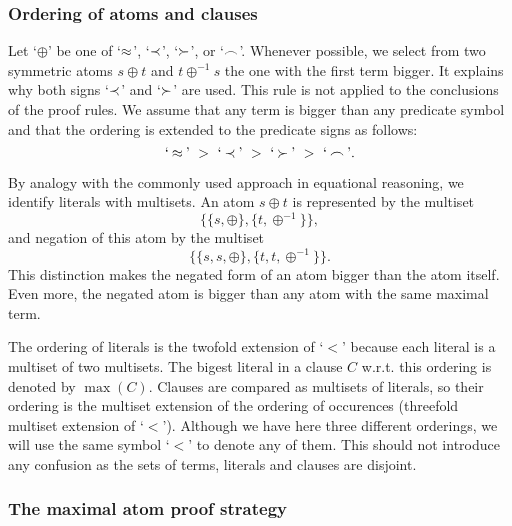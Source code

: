 \subsubsection{Ordering of atoms and clauses}

Let `\(\oplus \)' be one of `$\mathbin{\approx}$', `$\mathbin{\prec}$', `$\mathbin{\succ}$', or `$\mathbin{\frown}$'.  
Whenever possible, we select from two symmetric atoms $s\oplus t$ and
$t\oplus^{-1}s$ the one with the first term bigger. It explains why both
signs `$\mathbin{\prec}$' and  `$\mathbin{\succ}$' are used. This rule is not applied to the
conclusions of the proof rules. We assume that any
term is bigger than any predicate symbol and that the ordering is extended to
the predicate signs as follows:
\begin{equation} \label{eq:predicate-order}
\Mb`\Eq\Mb'\ >\ \Mb`\Incl\Mb'\ >\ \Mb`\Cont\Mb'\ >\ \Mb`\Int\Mb'.
\end{equation}

By analogy with the commonly used approach in equational reasoning, we
identify literals with multisets. An atom
$s\oplus t$ is represented by the multiset
\[\{\{s,\oplus\}, \{t,\oplus^{-1}\}\},\] 
and negation of this atom by the multiset 
\[\{\{s,s,\oplus\}, \{t,t,\oplus^{-1}\}\}.\] 
This distinction  makes the negated form of an atom
bigger than the atom itself. Even more, the negated atom is bigger than
any atom with the same maximal term. 

The ordering of literals is the twofold extension of `$<$' because each
literal is a multiset of two multisets. The bigest literal in a clause $C$ w.r.t.
this ordering is denoted by \(\max(C)\).  Clauses are compared as multisets of
literals, so their ordering is the multiset extension of the
ordering of occurences (threefold multiset extension of `$<$'). Although
we have here three different orderings, we will use the same symbol `$<$' to
denote any of them. This should not introduce any confusion as the
 sets of terms, literals and clauses are disjoint.

\subsubsection{The {\sc maximal atom} proof strategy}

